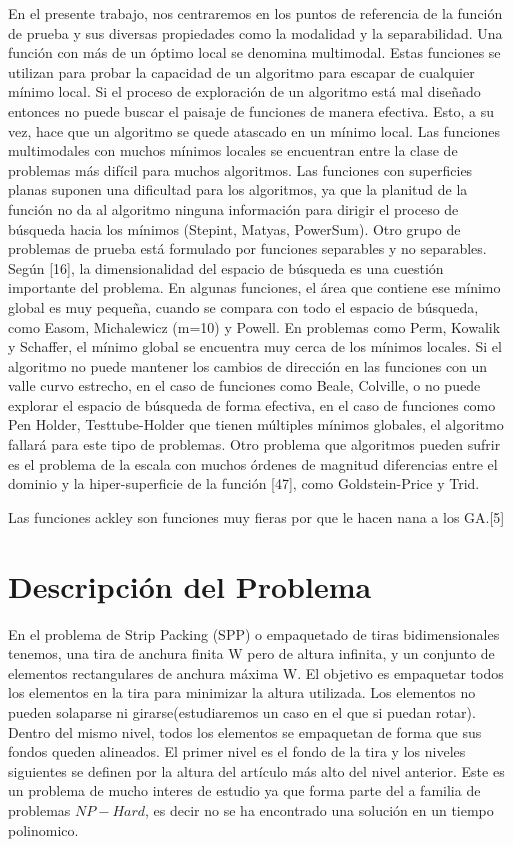 \documentclass[10pt]{article}
\begin{document}
En el presente trabajo, nos centraremos en los puntos de referencia de la función de prueba y sus diversas propiedades como la modalidad y la separabilidad. Una función con más de un óptimo local se denomina multimodal. Estas funciones se utilizan para probar la capacidad de un algoritmo para escapar de cualquier mínimo local. Si el proceso de exploración de un algoritmo está mal diseñado
entonces no puede buscar el paisaje de funciones de manera efectiva. Esto, a su vez, hace que un algoritmo se quede atascado en un mínimo local. Las funciones multimodales con muchos mínimos locales se encuentran entre la clase de problemas más difícil para muchos algoritmos. Las funciones con superficies planas suponen una
dificultad para los algoritmos, ya que la planitud de la función no da al algoritmo ninguna información para dirigir el proceso de búsqueda hacia los mínimos (Stepint, Matyas, PowerSum).
Otro grupo de problemas de prueba está formulado por funciones separables y no separables. Según [16], la dimensionalidad del espacio de búsqueda es una cuestión importante del problema. En algunas funciones, el área que contiene ese mínimo global es muy pequeña, cuando se compara con todo el espacio de búsqueda, como Easom, Michalewicz (m=10) y Powell. En problemas como Perm, Kowalik y Schaffer, el mínimo global se encuentra muy cerca de los mínimos locales. Si el algoritmo no puede mantener los cambios de dirección en las funciones con un valle curvo estrecho, en el caso de funciones como Beale, Colville, o no puede explorar el espacio de búsqueda de forma efectiva, en el caso de funciones como Pen Holder, Testtube-Holder que tienen múltiples mínimos globales, el algoritmo fallará para este tipo de problemas. Otro problema que algoritmos pueden sufrir es el problema de la escala con muchos órdenes de magnitud diferencias entre el dominio y la hiper-superficie de la función [47], como Goldstein-Price y Trid.

Las funciones ackley son funciones muy fieras por que le hacen nana a los GA.[5]


\section{Descripción del Problema}
En el problema  de Strip Packing (SPP) o empaquetado de tiras bidimensionales tenemos, una tira de anchura finita W pero de altura infinita, y un conjunto de elementos rectangulares de anchura máxima W. 
	El objetivo es empaquetar todos los elementos en la tira para minimizar la altura utilizada. Los elementos no pueden solaparse ni girarse(estudiaremos un caso en el que si puedan rotar). 
Dentro del mismo nivel, todos los elementos se empaquetan de forma que sus fondos queden alineados. El primer nivel es el fondo de la tira y los niveles siguientes se definen por la altura del artículo más alto del nivel anterior.
	Este es un problema de mucho interes de estudio ya que forma parte del a familia de problemas $NP-Hard$, es decir no se ha encontrado una solución en un tiempo polinomico.
\end{document}
